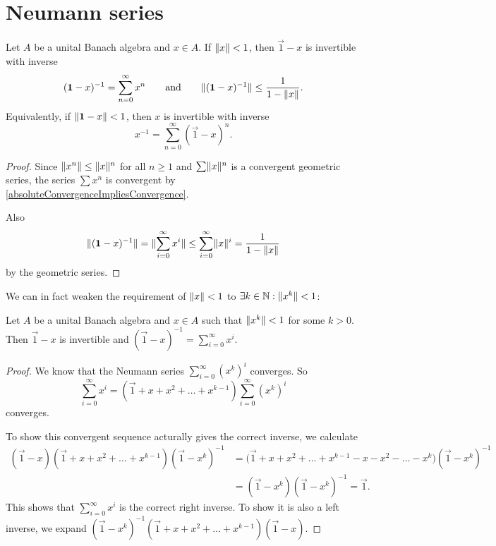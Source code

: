 \section{Neumann series}
\begin{proposition} \label{NeumannSeries}
Let $A$ be a unital Banach algebra and $x\in A$. 
If $\lVert x\rVert<1$, then $\vec{1}-x$ is invertible with inverse
\[ (\boldsymbol{\mathrm{1}}-x)^{-1} = \sum_{n=0}^\infty x^n \qquad\text{and}\qquad \lVert(\boldsymbol{\mathrm{1}} - x)^{-1}\rVert \leq \frac{1}{1-\lVert x\rVert}. \]
Equivalently, if $\lVert\boldsymbol{\mathrm{1}}-x\rVert< 1$, then $x$ is invertible with inverse
\[ x^{-1} = \sum_{n=0}^\infty(\vec{1}-x)^n. \]
\end{proposition}
\begin{proof}
Since $\lVert x^n\rVert\leq \lVert x\rVert^n$ for all $n\geq 1$ and $\sum \lVert x\rVert^n$ is a convergent geometric series, the series $\sum x^n$ is convergent by \ref{absoluteConvergenceImpliesConvergence}.

Also
\[ \lVert(\boldsymbol{\mathrm{1}} - x)^{-1}\rVert = \lVert\sum_{i=0}^\infty x^i\rVert \leq \sum_{i=0}^\infty \lVert x\rVert^i = \frac{1}{1-\lVert x\rVert} \]
by the geometric series.
\end{proof}
We can in fact weaken the requirement of $\lVert x\rVert<1$ to $\exists k\in\mathbb{N}: \lVert x^k\rVert<1$:
\begin{corollary} \label{NeumannSeriesEventuallyContractive}
Let $A$ be a unital Banach algebra and $x\in A$ such that $\lVert x^k\rVert<1$ for some $k>0$. Then $\vec{1} - x$ is invertible and $(\vec{1} - x)^{-1} = \sum_{i=0}^\infty x^i$.
\end{corollary}
\begin{proof}
We know that the Neumann series $\sum_{i=0}^\infty(x^k)^i$ converges. So
\[ \sum_{i=0}^\infty x^i = (\vec{1} + x + x^2 +\ldots + x^{k-1})\sum_{i=0}^\infty(x^k)^i \]
converges.

To show this convergent sequence acturally gives the correct inverse, we calculate
\begin{align*}
(\vec{1}-x)(\vec{1} + x + x^2 +\ldots + x^{k-1})(\vec{1} - x^k)^{-1} &= \Big(\vec{1} + x + x^2 +\ldots + x^{k-1} - x - x^2 -\ldots - x^{k}\Big)(\vec{1} - x^k)^{-1} \\
&= (\vec{1} - x^k)(\vec{1} - x^k)^{-1} = \vec{1}.
\end{align*}
This shows that $\sum_{i=0}^\infty x^i$ is the correct right inverse. To show it is also a left inverse, we expand $(\vec{1} - x^k)^{-1}(\vec{1} + x + x^2 +\ldots + x^{k-1})(\vec{1}-x)$.
\end{proof}


